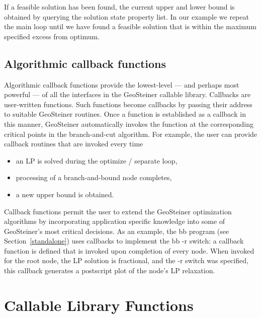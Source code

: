 \documentclass[12pt,twoside,letterpaper]{article}
\def\code#1{{\ttfamily #1}}
\def\geosteiner{Geo\-Steiner}
\begin{document}
If a feasible solution has been found, the current upper and lower
bound is obtained by querying the solution state property list. In our
example we repeat the main loop until we have found a feasible
solution that is within the maximum specified excess from optimum.


\subsection{Algorithmic callback functions}
\label{callback_interfaces}

Algorithmic callback functions provide the lowest-level --- and
perhaps most powerful --- of all the interfaces in the \geosteiner{}
callable library.
Callbacks are user-written functions.
Such functions become callbacks by passing their address to suitable
\geosteiner{} routines.
Once a function is established as a callback in this manner,
\geosteiner{} automatically invokes the function at the corresponding
critical points in the branch-and-cut algorithm.
For example, the user can provide callback routines that are invoked
every time
\begin{itemize}
  \item an LP is solved during the optimize / separate loop,
  \item processing of a branch-and-bound node completes,
  \item a new upper bound is obtained.
\end{itemize}
Callback functions permit the user to extend the \geosteiner{}
optimization algorithms by incorporating application specific
knowledge into some of \geosteiner{}'s most critical decisions.
As an example, the \code{bb} program (see Section~\ref{standalone})
uses callbacks to implement the 
\code{bb -r} switch: a callback function is defined that is invoked
upon completion of every node.  When invoked for the root node, the LP
solution is fractional, and the \code{-r} switch was specified, this
callback generates a postscript plot of the node's LP relaxation.


\clearpage
\section{Callable Library Functions}
\label{libraryfunctions}
\def\adescr#1{\begin{minipage}{9cm}{\vspace{2pt}#1\vspace{2pt}}\end{minipage}}
\end{document}
